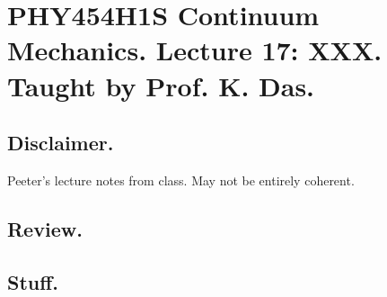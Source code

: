 
%

\chapter{PHY454H1S Continuum Mechanics.  Lecture 17: XXX.  Taught by Prof. K. Das.}
\label{chap:continuumL17}
{}
\date{Mar 16, 2012}

\beginArtWithToc

\section{Disclaimer.}

Peeter's lecture notes from class.  May not be entirely coherent.

\section{Review.}

\section{Stuff.}


\EndArticle
